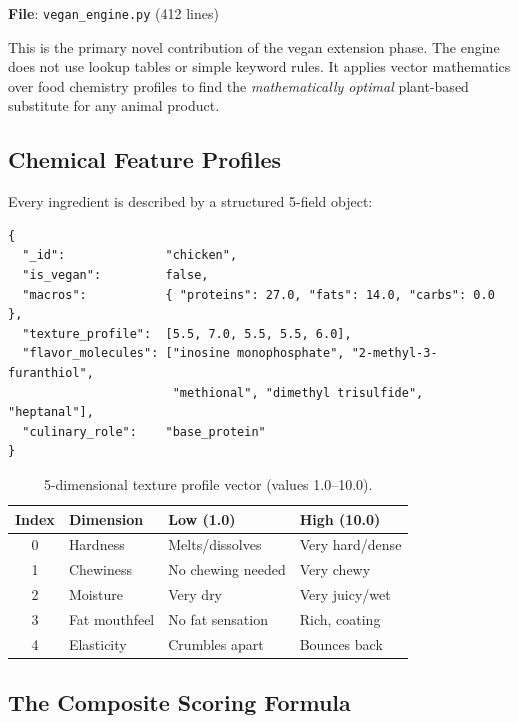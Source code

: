 \documentclass[12pt, a4paper]{article}
\begin{document}
\textbf{File}: \texttt{vegan\_engine.py} (412 lines)

This is the primary novel contribution of the vegan extension phase.  The engine does not use
lookup tables or simple keyword rules.  It applies vector mathematics over food chemistry
profiles to find the \emph{mathematically optimal} plant-based substitute for any animal
product.

\subsection{Chemical Feature Profiles}

Every ingredient is described by a structured 5-field object:

\begin{lstlisting}[style=json, caption={Example chemical feature profile for chicken.}]
{
  "_id":              "chicken",
  "is_vegan":         false,
  "macros":           { "proteins": 27.0, "fats": 14.0, "carbs": 0.0 },
  "texture_profile":  [5.5, 7.0, 5.5, 5.5, 6.0],
  "flavor_molecules": ["inosine monophosphate", "2-methyl-3-furanthiol",
                       "methional", "dimethyl trisulfide", "heptanal"],
  "culinary_role":    "base_protein"
}
\end{lstlisting}

\begin{table}[H]
\centering
\caption{5-dimensional texture profile vector (values 1.0--10.0).}
\label{tab:texture}
\begin{tabular}{c l l l}
\toprule
\textbf{Index} & \textbf{Dimension} & \textbf{Low (1.0)} & \textbf{High (10.0)} \\
\midrule
0 & Hardness       & Melts/dissolves   & Very hard/dense \\
1 & Chewiness      & No chewing needed & Very chewy \\
2 & Moisture       & Very dry          & Very juicy/wet \\
3 & Fat mouthfeel  & No fat sensation  & Rich, coating \\
4 & Elasticity     & Crumbles apart    & Bounces back \\
\bottomrule
\end{tabular}
\end{table}

\subsection{The Composite Scoring Formula}
\end{document}
